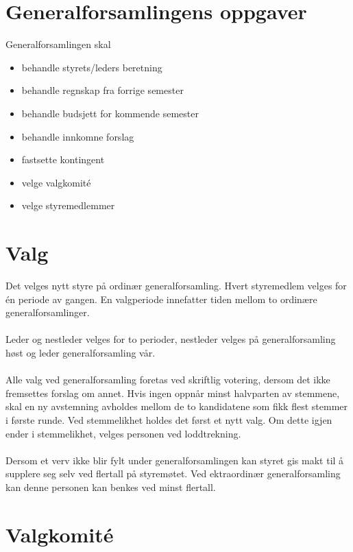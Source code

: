 \documentclass[12pt,a4paper,norsk]{article}
\begin{document}
\section{Generalforsamlingens oppgaver}

Generalforsamlingen skal

\begin{itemize}
    \item behandle styrets/leders beretning
    \item behandle regnskap fra forrige semester
    \item behandle budsjett for kommende semester
    \item behandle innkomne forslag
    \item fastsette kontingent
    \item velge valgkomité
    \item velge styremedlemmer
\end{itemize}



\section{Valg}

Det velges nytt styre på ordinær generalforsamling. Hvert styremedlem velges for én periode av gangen.
En valgperiode innefatter tiden mellom to ordinære generalforsamlinger.
\\
\\
Leder og nestleder velges for to perioder, nestleder velges på 
generalforsamling høst og leder generalforsamling vår.
\\
\\
Alle valg ved generalforsamling foretas ved skriftlig votering, dersom det ikke fremsettes forslag
om annet. Hvis ingen oppnår minst halvparten av stemmene, skal en ny avstemning avholdes
mellom de to kandidatene som fikk flest stemmer i første runde. Ved stemmelikhet holdes det
først et nytt valg. Om dette igjen ender i stemmelikhet, velges personen ved loddtrekning.
\\
\\
Dersom et verv ikke blir fylt under generalforsamlingen kan styret gis makt til å supplere 
seg selv ved  flertall på styremøtet. Ved ektraordinær generalforsamling kan denne personen kan benkes ved minst  flertall.



\section{Valgkomité}
\end{document}
